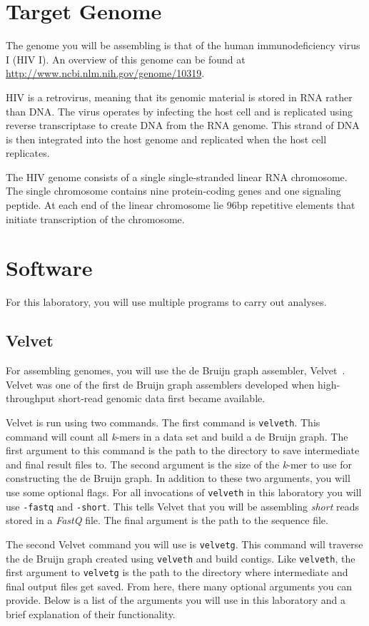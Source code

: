 \documentclass[11pt,a4paper]{scrartcl}
\begin{document}
\section*{Target Genome}
The genome you will be assembling is that of the human immunodeficiency virus I
(HIV I).  An overview of this genome can be found at
\url{http://www.ncbi.nlm.nih.gov/genome/10319}.

HIV is a retrovirus, meaning that its genomic material is stored in RNA rather
than DNA. The virus operates by infecting the host cell and is replicated using
reverse transcriptase to create DNA from the RNA genome. This strand of DNA is
then integrated into the host genome and replicated when the host cell
replicates.

The HIV genome consists of a single single-stranded linear RNA chromosome. The
single chromosome contains nine protein-coding genes and one signaling peptide.  At
each end of the linear chromosome lie 96bp repetitive elements that initiate
transcription of the chromosome. 


\section*{Software}
For this laboratory, you will use multiple programs to carry out analyses.

\subsection*{Velvet}
For assembling genomes, you will use the de Bruijn graph assembler, Velvet~\cite{velvet}.
Velvet was one of the first de Bruijn graph assemblers developed when
high-throughput short-read genomic data first became available. 

Velvet is run using two commands. The first command is \texttt{velveth}. This command
will count all \emph{k}-mers in a data set and build a de Bruijn graph. The first argument
to this command is the path to the directory to save intermediate and final result files to.
The second argument is the size of the \emph{k}-mer to use for constructing the de Bruijn graph. 
In addition to these two arguments, you will use some optional flags. For all invocations of \texttt{velveth}
in this laboratory you will use \texttt{-fastq} and \texttt{-short}. This tells Velvet that you will be assembling
\emph{short} reads stored in a \emph{FastQ} file. The final argument is the path to the sequence file.

The second Velvet command you will use is \texttt{velvetg}. This command will traverse the de Bruijn graph 
created using \texttt{velveth} and build contigs. Like \texttt{velveth}, the first argument to \texttt{velvetg}
is the path to the directory where intermediate and final output files get saved. From here, there many optional
arguments you can provide. Below is a list of the arguments you will use in this laboratory and a brief explanation
of their functionality. 
\end{document}
